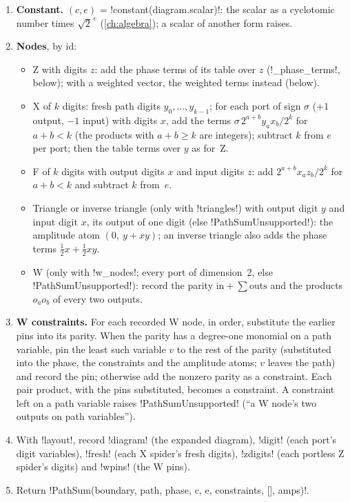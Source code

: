 \begin{algorithm}
\begin{enumerate}
\item \textbf{Constant.} $(c,e)$ = \py!constant(diagram.scalar)!: the scalar as a cyclotomic number times $\sqrt2^{\,e}$ (\cref{ch:algebra}); a scalar of another form raises.
\item \textbf{Nodes}, by id:
  \begin{itemize}
  \item Z with digits $z$: add the phase terms of its table over $z$ (\py!_phase_terms!, below); with a weighted vector, the weighted terms instead (below).
  \item X of $k$ digits: fresh path digits $y_0,\dots,y_{k-1}$; for each port of sign $\sigma$ ($+1$ output, $-1$ input) with digits $x$, add the terms $\sigma\,2^{a+b}y_a x_b/2^k$ for $a+b<k$ (the products with $a+b\ge k$ are integers); subtract $k$ from $e$ per port; then the table terms over $y$ as for~Z.
  \item F of $k$ digits with output digits $x$ and input digits $z$: add $2^{a+b}x_az_b/2^k$ for $a+b<k$ and subtract $k$ from~$e$.
  \item Triangle or inverse triangle (only with \py!triangles!) with output digit $y$ and input digit $x$, its output of one digit (else \py!PathSumUnsupported!): the amplitude atom $(0,\ y+xy)$; an inverse triangle also adds the phase terms $\tfrac12x+\tfrac12xy$.
  \item W (only with \py!w_nodes!; every port of dimension~2, else \py!PathSumUnsupported!): record the parity $\text{in}+\sum\text{outs}$ and the products $o_ao_b$ of every two outputs.
  \end{itemize}
\item \textbf{W constraints.} For each recorded W node, in order, substitute the earlier pins into its parity. When the parity has a degree-one monomial on a path variable, pin the least such variable $v$ to the rest of the parity (substituted into the phase, the constraints and the amplitude atoms; $v$ leaves the path) and record the pin; otherwise add the nonzero parity as a constraint. Each pair product, with the pins substituted, becomes a constraint. A constraint left on a path variable raises \py!PathSumUnsupported! (``a W node's two outputs on path variables'').
\item With \py!layout!, record \code!diagram! (the expanded diagram), \code!digit! (each port's digit variables), \code!fresh! (each X spider's fresh digits), \code!zdigits! (each portless Z spider's digits) and \code!wpins! (the W pins).
\item Return \py!PathSum(boundary, path, phase, c, e, constraints, [], amps)!.
\end{enumerate}
\end{algorithm}

